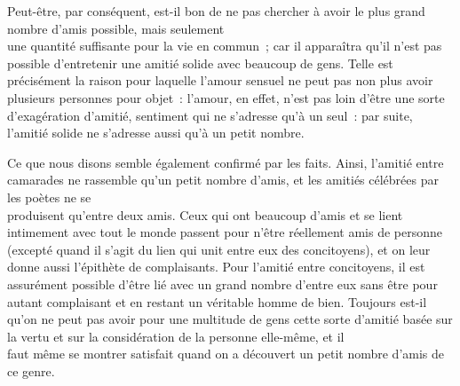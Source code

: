 \documentclass[french,twoside]{book} %
\begin{document}
Peut-être, par conséquent, est-il bon de ne pas chercher à avoir le plus grand nombre d’amis possible, mais seulement \\
une quantité suffisante pour la vie en commun ; car il apparaîtra qu’il n’est pas possible d’entretenir une amitié solide avec beaucoup de gens. Telle est précisément la raison pour laquelle l’amour sensuel ne peut pas non plus avoir plusieurs personnes pour objet : l’amour, en effet, n’est pas loin d’être une sorte d’exagération d’amitié, sentiment qui ne s’adresse qu’à un seul : par suite, l’amitié solide ne s’adresse aussi qu’à un petit nombre.\par
Ce que nous disons semble également confirmé par les faits. Ainsi, l’amitié entre camarades ne rassemble qu’un petit nombre d’amis, et les amitiés célébrées par les poètes ne se \\
produisent qu’entre deux amis. Ceux qui ont beaucoup d’amis et se lient intimement avec tout le monde passent pour n’être réellement amis de personne (excepté quand il s’agit du lien qui unit entre eux des concitoyens), et on leur donne aussi l’épithète de complaisants. Pour l’amitié entre concitoyens, il est assurément possible d’être lié avec un grand nombre d’entre eux sans être pour autant complaisant et en restant un véritable homme de bien. Toujours est-il qu’on ne peut pas avoir pour une multitude de gens cette sorte d’amitié basée sur la vertu et sur la considération de la personne elle-même, et il \\
faut même se montrer satisfait quand on a découvert un petit nombre d’amis de ce genre.
\end{document}
